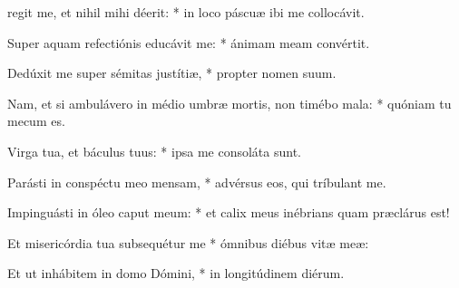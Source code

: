 \begin{psalmus}

		 regit me, et nihil mihi déerit: * in loco páscuæ ibi me collocávit.

		Super aquam refectiónis educávit me: * ánimam meam convértit.

		Dedúxit me super sémitas justítiæ, * propter nomen suum.

		Nam, et si ambulávero in médio umbræ mortis, non timébo mala: * quóniam tu mecum es.

		Virga tua, et báculus tuus: * ipsa me consoláta sunt.

		Parásti in conspéctu meo mensam, * advérsus eos, qui tríbulant me.

		Impinguásti in óleo caput meum: * et calix meus inébrians quam præclárus est!

		Et misericórdia tua subsequétur me * ómnibus diébus vitæ meæ:

		Et ut inhábitem in domo Dómini, * in longitúdinem diérum.
\end{psalmus}

